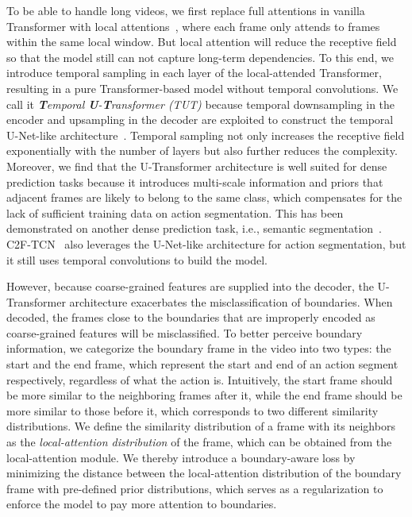 \documentclass[letterpaper]{article} \usepackage[submission]{aaai23}  \usepackage{times}  \usepackage{helvet}  \usepackage{courier}  \usepackage[hyphens]{url}  \usepackage{graphicx} \urlstyle{rm} \def\UrlFont{\rm}  \usepackage{natbib}  \usepackage{caption} \frenchspacing  \setlength{\pdfpagewidth}{8.5in} \setlength{\pdfpageheight}{11in} \usepackage{algorithm}
\begin{document}
To be able to handle long videos, we first replace full attentions in vanilla Transformer with local attentions~\cite{beltagy2020longformer}, where each frame only attends to frames within the same local window. But local attention will reduce the receptive field so that the model still can not capture long-term dependencies. To this end, we introduce temporal sampling in each layer of the local-attended Transformer, resulting in a pure Transformer-based model without temporal convolutions. We call it \textit{\textbf{T}emporal \textbf{U}-\textbf{T}ransformer (TUT)} because temporal downsampling in the encoder and upsampling in the decoder are exploited to construct the temporal U-Net-like architecture~\cite{ron2015unet}. Temporal sampling not only increases the receptive field exponentially with the number of layers but also further reduces the complexity. Moreover, we find that the U-Transformer architecture is well suited for dense prediction tasks because it introduces multi-scale information and priors that adjacent frames are likely to belong to the same class, which compensates for the lack of sufficient training data on action segmentation. This has been demonstrated on another dense prediction task, i.e., semantic segmentation~\cite{xie2021segformer,cao2021swinunet,ji2021multi}. C2F-TCN~\cite{singhania2021coarse} also leverages the U-Net-like architecture for action segmentation, but it still uses temporal convolutions to build the model. 



However, because coarse-grained features are supplied into the decoder, the U-Transformer architecture exacerbates the misclassification of boundaries. When decoded, the frames close to the boundaries that are improperly encoded as coarse-grained features will be misclassified. To better perceive boundary information, we categorize the boundary frame in the video into two types: the start and the end frame, which represent the start and end of an action segment respectively, regardless of what the action is. Intuitively, the start frame should be more similar to the neighboring frames after it, while the end frame should be more similar to those before it, which corresponds to two different similarity distributions. We define the similarity distribution of a frame with its neighbors as the \textit{local-attention distribution} of the frame, which can be obtained from the local-attention module. We thereby introduce a boundary-aware loss by minimizing the distance between the local-attention distribution of the boundary frame with pre-defined prior distributions, which serves as a regularization to enforce the model to pay more attention to boundaries.
\end{document}
